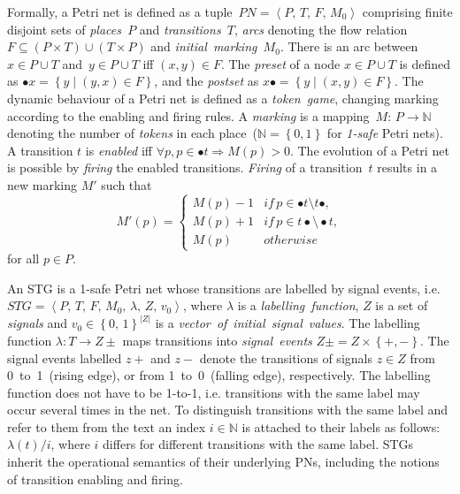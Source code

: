 \documentclass[british,compsoc]{IEEEtran}
\begin{document}
Formally, a Petri net is defined as a tuple~$PN=\left\langle P,\, T,\, F,\, M_{0}\right\rangle $
comprising finite disjoint sets of \emph{places~}$P$ and \emph{transitions~}$T$,
\emph{arcs} denoting the flow relation~$F\subseteq\left(P\times T\right)\cup\left(T\times P\right)$
and \emph{initial~marking~}$M_{0}$. There is an arc between~$x\in P\cup T$
and~$y\in P\cup T$ iff $\left(x,y\right)\in F$. The \emph{preset}
of a node $x\in P\cup T$ is defined as $\bullet x=\left\{ y\mid\left(y,x\right)\in F\right\} $,
and the \emph{postset} as $x\bullet=\left\{ y\mid\left(x,y\right)\in F\right\} $.
The dynamic behaviour of a Petri net is defined as a \emph{token~game},
changing marking according to the enabling and firing rules. A \emph{marking}
is a mapping~$M:\, P\rightarrow\mathbb{N}$ denoting the number of
\emph{tokens} in each place~($\mathbb{N}=\left\{ 0,1\right\} $ for
\emph{1-safe} Petri nets). A transition $t$ is \emph{enabled} iff
$\forall p,p\in\bullet t\Rightarrow M(p)>0$. The evolution of a Petri
net is possible by \emph{firing} the enabled transitions. \emph{Firing}
of a transition~$t$ results in a new marking $M'$ such that
\[
M'\left(p\right)=\left\{ \begin{array}{cc}
M(p)-1 & if\, p\in\bullet t\setminus t\bullet,\\
M(p)+1 & if\, p\in t\bullet\setminus\bullet t,\\
M(p)\,\,\,\,\, & otherwise
\end{array}\right.
\]
 for all $p\in P$.

An STG is a 1-safe Petri net whose transitions are labelled by signal
events, i.e. $STG=\left\langle P,\, T,\, F,\, M_{0},\,\lambda,\, Z,\, v_{0}\right\rangle $,
where $\lambda$ is a \emph{labelling~function}, $Z$ is a set of
\emph{signals} and $v_{0}\in\left\{ 0,\,1\right\} ^{\left|Z\right|}$
is a \emph{vector~of}~\emph{initial~signal~values}. The labelling
function $\lambda:T\rightarrow Z\pm$ maps transitions into \emph{signal~events}
$Z\pm=Z\times\left\{ +,-\right\} $. The signal events labelled $z+$
and $z-$ denote the transitions of signals $z\in Z$ from 0~to~1~(rising
edge), or from 1~to~0~(falling edge), respectively. The labelling
function does not have to be 1-to-1, i.e. transitions with the same
label may occur several times in the net. To distinguish transitions
with the same label and refer to them from the text an index $i\in\mathbb{N}$
is attached to their labels as follows: $\lambda\left(t\right)/i$,
where $i$ differs for different transitions with the same label.
STGs inherit the operational semantics of their underlying PNs, including
the notions of transition enabling and firing.
\end{document}
